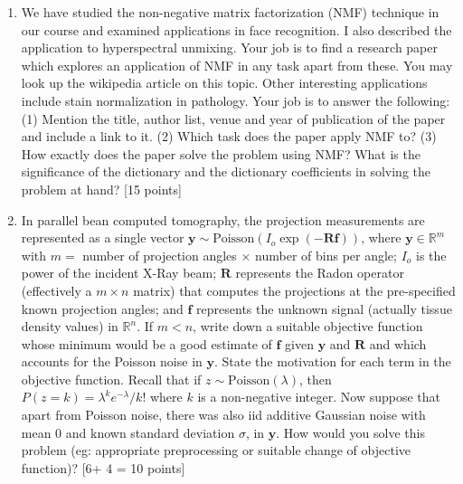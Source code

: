 \documentclass[11pt]{article}
\begin{document}
\begin{enumerate}
\item We have studied the non-negative matrix factorization (NMF) technique in our course and examined applications in face recognition. I also described the application to hyperspectral unmixing. Your job is to find a research paper which explores an application of NMF in any task apart from these. You may look up the wikipedia article on this topic. Other interesting applications include stain normalization in pathology. Your job is to answer the following: (1) Mention the title, author list, venue and year of publication of the paper and include a link to it. (2) Which task does the paper apply NMF to? (3) How exactly does the paper solve the problem using NMF? What is the significance of the dictionary and the dictionary coefficients in solving the problem at hand? \textsf{[15 points]}

\item In parallel bean computed tomography, the projection measurements are represented as a single vector $\boldsymbol{y} \sim \textrm{Poisson}(I_o \exp(-\boldsymbol{R f}))$, where $\boldsymbol{y} \in \mathbb{R}^m$ with $m = $ number of projection angles $\times$ number of bins per angle; $I_o$ is the power of the incident X-Ray beam; $\boldsymbol{R}$ represents the Radon operator (effectively a $m \times n$ matrix) that computes the projections at the pre-specified known projection angles; and $\boldsymbol{f}$ represents the unknown signal (actually tissue density values) in $\mathbb{R}^n$. If $m < n$, write down a suitable objective function whose minimum would be a good estimate of $\boldsymbol{f}$ given $\boldsymbol{y}$ and $\boldsymbol{R}$ and which accounts for the Poisson noise in $\boldsymbol{y}$. State the motivation for each term in the objective function. Recall that if $z \sim \textrm{Poisson}(\lambda)$, then $P(z = k) = \lambda^k e^{-\lambda} / k!$ where $k$ is a non-negative integer. Now suppose that apart from Poisson noise, there was also iid additive Gaussian noise with mean 0 and known standard deviation $\sigma$, in $\boldsymbol{y}$. How would you solve this problem (eg: appropriate preprocessing or suitable change of objective function)?
\textsf{[6+ 4 = 10 points]}


\end{enumerate}
\end{document}
